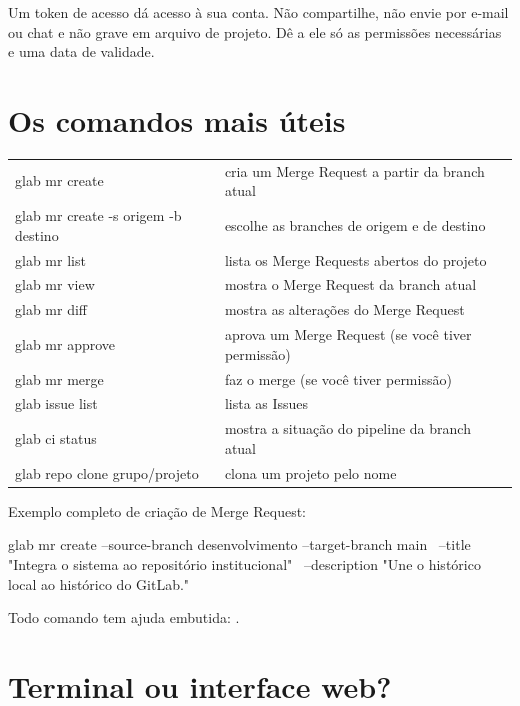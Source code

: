 \begin{atencao}
Um token de acesso dá acesso à sua conta. Não compartilhe, não envie por e-mail ou chat e não grave em arquivo de projeto. Dê a ele só as permissões necessárias e uma data de validade.
\end{atencao}

\section{Os comandos mais úteis}

\begin{center}
\renewcommand{\arraystretch}{1.3}
\begin{tabularx}{\linewidth}{@{}>{\ttfamily\color{azulMB}}l X@{}}
\toprule
glab mr create & cria um Merge Request a partir da branch atual \\
glab mr create -s origem -b destino & escolhe as branches de origem e de destino \\
glab mr list & lista os Merge Requests abertos do projeto \\
glab mr view & mostra o Merge Request da branch atual \\
glab mr diff & mostra as alterações do Merge Request \\
glab mr approve & aprova um Merge Request (se você tiver permissão) \\
glab mr merge & faz o merge (se você tiver permissão) \\
glab issue list & lista as Issues \\
glab ci status & mostra a situação do pipeline da branch atual \\
glab repo clone grupo/projeto & clona um projeto pelo nome \\
\bottomrule
\end{tabularx}
\end{center}

Exemplo completo de criação de Merge Request:

\begin{terminal}
glab mr create --source-branch desenvolvimento --target-branch main \
  --title "Integra o sistema ao repositório institucional" \
  --description "Une o histórico local ao histórico do GitLab."
\end{terminal}

Todo comando tem ajuda embutida: .

\section{Terminal ou interface web?}


